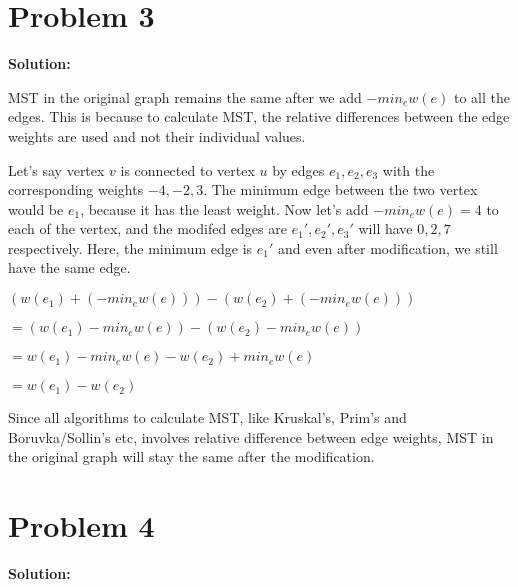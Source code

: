 \documentclass{article}
\begin{document}
\section*{Problem 3}
\textbf{Solution:}


MST in the original graph remains the same after we add $-min_ew(e)$ to all the edges. This is because to calculate MST, the relative differences between the edge weights are used and not their individual values.

Let's say vertex $v$ is connected to vertex $u$ by edges $e_1, e_2, e_3$ with the corresponding weights $-4, -2, 3$. The minimum edge between the two vertex would be $e_1$, because it has the least weight. Now let's add $-min_ew(e)=4$ to each of the vertex, and the modifed edges are $e_1\prime, e_2\prime, e_3\prime$ will have $0, 2, 7$ respectively. Here, the minimum edge is $e_1\prime$ and even after modification, we still have the same edge.
\vspace{2mm}

$(w(e_1)+(-min_ew(e)))-(w(e_2)+(-min_ew(e)))$

\qquad$= (w(e_1)-min_ew(e))-(w(e_2)-min_ew(e))$

\qquad$= w(e_1)-min_ew(e)-w(e_2)+min_ew(e)$

\qquad$= w(e_1)-w(e_2)$
\vspace{2mm}

Since all algorithms to calculate MST, like Kruskal's, Prim's and Boruvka/Sollin's etc, involves relative difference between edge weights, MST in the original graph will stay the same after the modification.


\section*{Problem 4}
\textbf{Solution:}
\end{document}
